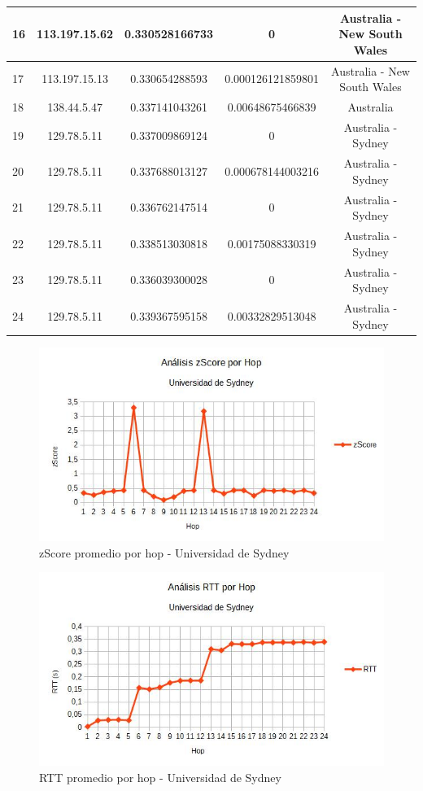 \begin{tabular}{ | l | c | c | c | c |}
  \hline
  16  &  113.197.15.62  &  0.330528166733  &  0 & Australia - New South Wales\\
  \hline
  17  &  113.197.15.13  &  0.330654288593  &  0.000126121859801 & Australia - New South Wales\\
  \hline
  18  &  138.44.5.47  &  0.337141043261  &  0.00648675466839 & Australia\\
  \hline
  19  &  129.78.5.11  &  0.337009869124  &  0 & Australia - Sydney\\
  \hline
  20  &  129.78.5.11  &  0.337688013127  &  0.000678144003216 & Australia - Sydney\\
  \hline
  21  &  129.78.5.11  &  0.336762147514  &  0 & Australia - Sydney\\
  \hline
  22  &  129.78.5.11  &  0.338513030818  &  0.00175088330319 & Australia - Sydney\\
  \hline
  23  &  129.78.5.11  &  0.336039300028  &  0 & Australia - Sydney\\
  \hline
  24  &  129.78.5.11  &  0.339367595158  &  0.00332829513048 & Australia - Sydney\\
  \hline

\end{tabular}

\bigskip

\begin{figure}[H]
\centering
\includegraphics[width=1\textwidth]{graficos/zScore_Australia.jpg}
\caption{zScore promedio por hop - Universidad de Sydney}
\label{Australia_zs}
\end{figure}

\begin{figure}[H]
\centering
\includegraphics[width=1\textwidth]{graficos/rTT_Australia.jpg}
\caption{RTT promedio por hop - Universidad de Sydney}
\label{Australia_rtt}
\end{figure}